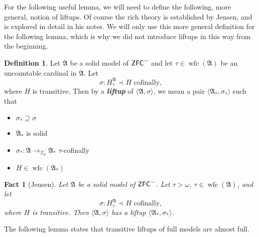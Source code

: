 \documentclass{amsart}
\newtheorem{fact}[theorem]{Fact}
\theoremstyle{definition}
\newtheorem{definition}[theorem]{Definition}
\theoremstyle{remark}
\newcommand{\ZFC}{\textup{\ensuremath{\textsf{ZFC}}}}
\DeclareMathOperator{\wfc}{wfc}
\begin{document}
For the following useful lemma, we will need to define the following, more general, notion of liftups. Of course the rich theory is established by Jensen, and is explored in detail in his notes. We will only use this more general definition for the following lemma, which is why we did not introduce liftups in this way from the beginning.
\begin{definition} Let $\mathfrak A$ be a solid model of $\ZFC^-$ and let $\tau \in \wfc(\mathfrak A)$ be an uncountable cardinal in $\mathfrak A$. Let $$\sigma: H_{\tau}^\mathfrak A \prec H \text{ cofinally,}$$ where $H$ is transitive. Then by a \textit{\textbf{liftup}} of $\langle \mathfrak A, \sigma\rangle$, we mean a pair $\langle {\mathfrak A}_*, \sigma_* \rangle$ such that 
\begin{itemize}
	\item $\sigma_* \supseteq \sigma$
	\item ${\mathfrak A}_*$ is solid
	\item $\sigma_*: \mathfrak A \to_{\Sigma_0} {\mathfrak A}_*$ $\tau$-cofinally
	\item $H \in \wfc({\mathfrak A}_*)$ \qedhere
\end{itemize}
\end{definition}
\begin{fact}[Jensen]\label{fact:solidliftup} Let $\mathfrak A$ be a solid model of $\ZFC^-$. Let $\tau > \omega$, $\tau \in \wfc(\mathfrak A)$, and let $$\sigma: H_{\tau}^{\mathfrak A} \prec H \text{ cofinally,}$$  where $H$ is transitive. Then $\langle \mathfrak A, \sigma \rangle$ has a liftup $\langle \mathfrak A_*, \sigma_* \rangle$.
\end{fact}

The following lemma states that transitive liftups of full models are almost full.
\end{document}

